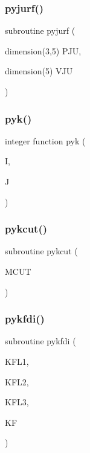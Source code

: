 \subsubsection{\texorpdfstring{pyjurf()}{pyjurf()}}
{\footnotesize\ttfamily subroutine pyjurf (\begin{DoxyParamCaption}\item[{dimension(3,5)}]{P\+JU,  }\item[{dimension(5)}]{V\+JU }\end{DoxyParamCaption})}

\mbox{\label{pythia-6_84_824_8f_ac6c322b0c629a97954c1221c422609e7}} 
\subsubsection{\texorpdfstring{pyk()}{pyk()}}
{\footnotesize\ttfamily integer function pyk (\begin{DoxyParamCaption}\item[{}]{I,  }\item[{}]{J }\end{DoxyParamCaption})}

\mbox{\label{pythia-6_84_824_8f_aa0d00f200e99efa1612d9551bd6fa140}} 
\subsubsection{\texorpdfstring{pykcut()}{pykcut()}}
{\footnotesize\ttfamily subroutine pykcut (\begin{DoxyParamCaption}\item[{}]{M\+C\+UT }\end{DoxyParamCaption})}

\mbox{\label{pythia-6_84_824_8f_ab762550f3025c60b2731636ec9577946}} 
\subsubsection{\texorpdfstring{pykfdi()}{pykfdi()}}
{\footnotesize\ttfamily subroutine pykfdi (\begin{DoxyParamCaption}\item[{}]{K\+F\+L1,  }\item[{}]{K\+F\+L2,  }\item[{}]{K\+F\+L3,  }\item[{}]{KF }\end{DoxyParamCaption})}

